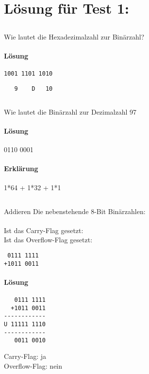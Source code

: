 

\section{Lösung für Test 1:}
\subsection{}
Wie lautet die Hexadezimalzahl zur Binärzahl?
\paragraph{Lösung}
\begin{lstlisting}
1001 1101 1010
\end{lstlisting}
\begin{lstlisting}
   9    D   10 
\end{lstlisting}
\subsection{}
Wie lautet die Binärzahl zur Dezimalzahl 97
\paragraph{Lösung}
0110 0001
\paragraph{Erklärung}
1*64 + 1*32 + 1*1
\subsection{} 
Addieren Die nebenstehende 8-Bit Binärzahlen:\\
\\
Ist das Carry-Flag gesetzt:\\
Ist das Overflow-Flag gesetzt:
\begin{lstlisting}
 0111 1111
+1011 0011 
\end{lstlisting}
\paragraph{Lösung}
\begin{lstlisting}
   0111 1111
  +1011 0011
------------
U 11111 1110
------------
   0011 0010
\end{lstlisting}
Carry-Flag: 	ja\\
Overflow-Flag:	nein\\

